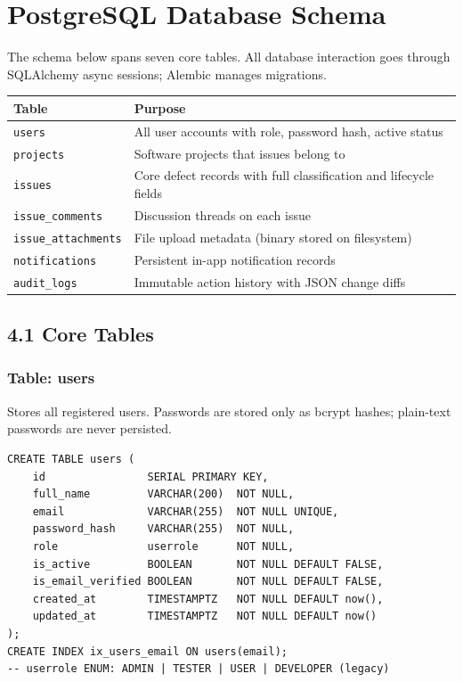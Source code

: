 \documentclass[11pt]{article}
\newcommand{\tblhead}[1]{\rowcolor{accent}\color{white}\bfseries #1}
\begin{document}
\section{PostgreSQL Database Schema}

The schema below spans seven core tables. All database interaction goes through SQLAlchemy async sessions; Alembic manages migrations.

\renewcommand{\arraystretch}{1.25}
\begin{tabular}{|L{4cm}|L{11.8cm}|}
\hline
\tblhead{Table} & \tblhead{Purpose} \\
\hline
\texttt{users} & All user accounts with role, password hash, active status \\
\hline
\texttt{projects} & Software projects that issues belong to \\
\hline
\texttt{issues} & Core defect records with full classification and lifecycle fields \\
\hline
\texttt{issue\_comments} & Discussion threads on each issue \\
\hline
\texttt{issue\_attachments} & File upload metadata (binary stored on filesystem) \\
\hline
\texttt{notifications} & Persistent in-app notification records \\
\hline
\texttt{audit\_logs} & Immutable action history with JSON change diffs \\
\hline
\end{tabular}
\endrowcolors

\subsection{4.1 Core Tables}

\subsubsection{Table: users}
Stores all registered users. Passwords are stored only as bcrypt hashes; plain-text passwords are never persisted.

\begin{lstlisting}
CREATE TABLE users (
    id                SERIAL PRIMARY KEY,
    full_name         VARCHAR(200)  NOT NULL,
    email             VARCHAR(255)  NOT NULL UNIQUE,
    password_hash     VARCHAR(255)  NOT NULL,
    role              userrole      NOT NULL,
    is_active         BOOLEAN       NOT NULL DEFAULT FALSE,
    is_email_verified BOOLEAN       NOT NULL DEFAULT FALSE,
    created_at        TIMESTAMPTZ   NOT NULL DEFAULT now(),
    updated_at        TIMESTAMPTZ   NOT NULL DEFAULT now()
);
CREATE INDEX ix_users_email ON users(email);
-- userrole ENUM: ADMIN | TESTER | USER | DEVELOPER (legacy)
\end{lstlisting}
\end{document}
